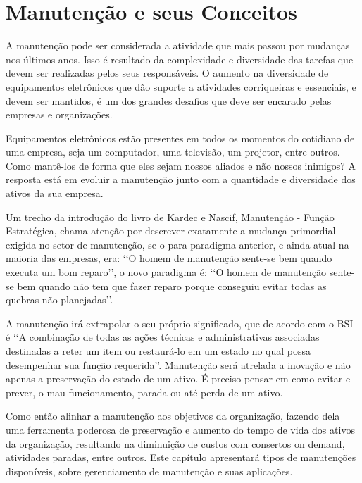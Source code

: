 \chapter{Manutenção e seus Conceitos}
\label{cap-manutencao}

A manutenção pode ser considerada a atividade que mais passou por mudanças nos últimos anos. Isso é resultado da complexidade e diversidade das tarefas que devem ser realizadas pelos seus responsáveis. O aumento na diversidade de equipamentos eletrônicos que dão suporte a atividades corriqueiras e essenciais, e devem ser mantidos, é um dos grandes desafios que deve ser encarado pelas empresas e organizações.

Equipamentos eletrônicos estão presentes em todos os momentos do cotidiano de uma empresa, seja um computador, uma televisão, um projetor, entre outros. Como mantê-los de forma que eles sejam nossos aliados e não nossos inimigos? A resposta está em evoluir a manutenção junto com a quantidade e diversidade dos ativos da sua empresa.
	
Um trecho da introdução do livro de Kardec e Nascif, Manutenção - Função Estratégica, chama atenção por descrever exatamente a mudança primordial exigida no setor de manutenção, se o para paradigma anterior, e ainda atual na maioria das empresas, era: \lq\lq O homem de manutenção sente-se bem quando executa um bom reparo\rq\rq, o novo paradigma é: \lq\lq O homem de manutenção sente-se bem quando não tem que fazer reparo porque conseguiu evitar todas as quebras não planejadas\rq\rq.
	
A manutenção irá extrapolar o seu próprio significado, que de acordo com o BSI \cite{british1993bs} é \lq\lq A combinação de todas as ações técnicas e administrativas associadas destinadas a reter um item ou restaurá-lo em um estado no qual possa desempenhar sua função requerida\rq\rq. Manutenção será atrelada a inovação e não apenas a preservação do estado de um ativo. É preciso pensar em como evitar e prever, o mau funcionamento, parada ou até perda de um ativo.
	
Como então alinhar a manutenção aos objetivos da organização, fazendo dela uma ferramenta poderosa de preservação e aumento do tempo de vida dos ativos da organização, resultando na diminuição de custos com consertos on demand, atividades paradas, entre outros. Este capítulo apresentará tipos de manutenções disponíveis, sobre gerenciamento de manutenção e suas aplicações.


